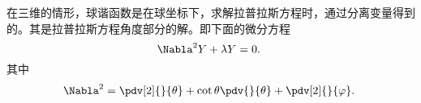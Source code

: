 

在三维的情形，球谐函数是在球坐标下，求解拉普拉斯方程时，通过分离变量得到的。其是拉普拉斯方程角度部分的解。即下面的微分方程
\begin{equation}
\Nabla^2 Y+\lambda Y=0.~
\end{equation}
其中 
\begin{equation}
\Nabla^2=\pdv[2]{}{\theta}+\cot\theta\pdv{}{\theta}+\pdv[2]{}{\varphi}.~
\end{equation}











